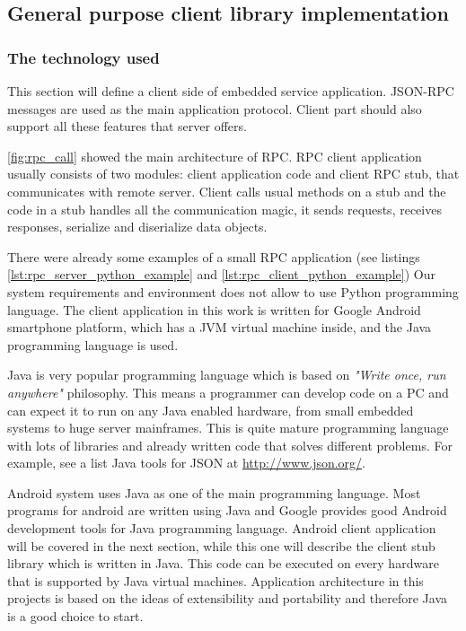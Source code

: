 \newpage
\subsection{General purpose client library implementation}

\subsubsection{The technology used}
This section will define a client side of embedded service application.
JSON-RPC messages are used as the main application protocol.
Client part should also support all these features that server offers.

\autoref{fig:rpc_call} showed the main architecture of RPC.
RPC client   application usually consists of two modules: client application code
and client RPC stub, that communicates with remote server.
Client calls usual methods on a stub and the code in a stub handles all
the communication magic, it sends requests, receives responses, serialize and
diserialize data objects.

There were already some examples of a small RPC application (see listings
\ref{lst:rpc_server_python_example} and
\ref{lst:rpc_client_python_example})
Our system requirements and environment does not allow to use Python programming
language.
The client application in this work is written for Google Android smartphone
platform, which has a \gls{JVM} virtual machine inside, and the Java programming
language is used.

Java is very popular programming language which is based on \textit{"Write
once, run anywhere"} philosophy. This means a programmer can develop code on a
PC and can expect it to run on any Java enabled hardware, from small embedded systems
to huge server mainframes. 
This is quite mature programming language with lots of libraries and already
written code that solves different problems. For example, see a list Java tools
for JSON at \url{http://www.json.org/}.

Android system uses Java as one of the main programming language. 
Most programs for android are written using Java and Google provides good
Android development tools for Java programming language.
Android client application will be covered in the next section, while this one will describe the client
stub library which is written in Java. 
This code can be executed on every hardware that is supported by Java virtual
machines. Application architecture in this projects is based on the ideas of
extensibility and portability and therefore Java is a good choice to start.

